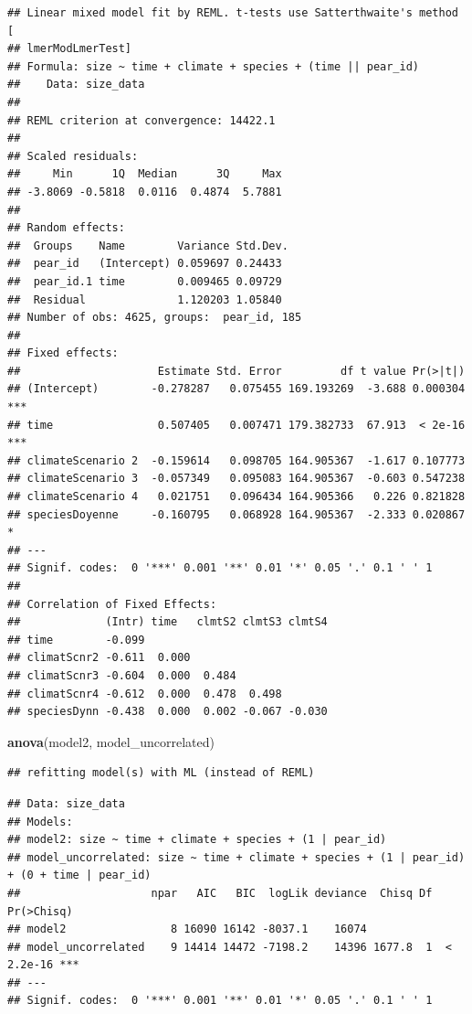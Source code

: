 \documentclass[
]{article}
\newenvironment{Shaded}{\begin{snugshade}}{\end{snugshade}}
\newcommand{\FunctionTok}[1]{\textcolor[rgb]{0.13,0.29,0.53}{\textbf{#1}}}
\newcommand{\NormalTok}[1]{#1}
\begin{document}
\begin{verbatim}
## Linear mixed model fit by REML. t-tests use Satterthwaite's method [
## lmerModLmerTest]
## Formula: size ~ time + climate + species + (time || pear_id)
##    Data: size_data
## 
## REML criterion at convergence: 14422.1
## 
## Scaled residuals: 
##     Min      1Q  Median      3Q     Max 
## -3.8069 -0.5818  0.0116  0.4874  5.7881 
## 
## Random effects:
##  Groups    Name        Variance Std.Dev.
##  pear_id   (Intercept) 0.059697 0.24433 
##  pear_id.1 time        0.009465 0.09729 
##  Residual              1.120203 1.05840 
## Number of obs: 4625, groups:  pear_id, 185
## 
## Fixed effects:
##                     Estimate Std. Error         df t value Pr(>|t|)    
## (Intercept)        -0.278287   0.075455 169.193269  -3.688 0.000304 ***
## time                0.507405   0.007471 179.382733  67.913  < 2e-16 ***
## climateScenario 2  -0.159614   0.098705 164.905367  -1.617 0.107773    
## climateScenario 3  -0.057349   0.095083 164.905367  -0.603 0.547238    
## climateScenario 4   0.021751   0.096434 164.905366   0.226 0.821828    
## speciesDoyenne     -0.160795   0.068928 164.905367  -2.333 0.020867 *  
## ---
## Signif. codes:  0 '***' 0.001 '**' 0.01 '*' 0.05 '.' 0.1 ' ' 1
## 
## Correlation of Fixed Effects:
##             (Intr) time   clmtS2 clmtS3 clmtS4
## time        -0.099                            
## climatScnr2 -0.611  0.000                     
## climatScnr3 -0.604  0.000  0.484              
## climatScnr4 -0.612  0.000  0.478  0.498       
## speciesDynn -0.438  0.000  0.002 -0.067 -0.030
\end{verbatim}

\begin{Shaded}
\begin{Highlighting}[]
\FunctionTok{anova}\NormalTok{(model2, model\_uncorrelated)}
\end{Highlighting}
\end{Shaded}

\begin{verbatim}
## refitting model(s) with ML (instead of REML)
\end{verbatim}

\begin{verbatim}
## Data: size_data
## Models:
## model2: size ~ time + climate + species + (1 | pear_id)
## model_uncorrelated: size ~ time + climate + species + (1 | pear_id) + (0 + time | pear_id)
##                    npar   AIC   BIC  logLik deviance  Chisq Df Pr(>Chisq)    
## model2                8 16090 16142 -8037.1    16074                         
## model_uncorrelated    9 14414 14472 -7198.2    14396 1677.8  1  < 2.2e-16 ***
## ---
## Signif. codes:  0 '***' 0.001 '**' 0.01 '*' 0.05 '.' 0.1 ' ' 1
\end{verbatim}
\end{document}
